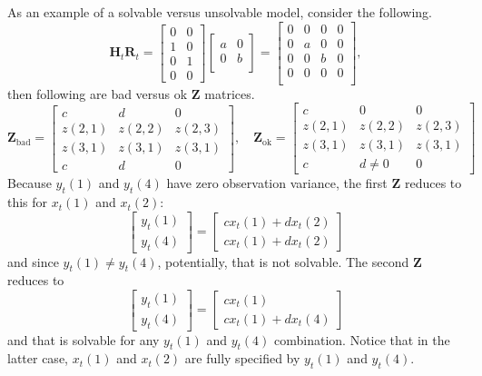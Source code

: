 \documentclass[]{article}
\def\XI{\mbox{\boldmath $\Xi$}}
\def\HH{\mbox{$\mathbf H$}}	\def\hh{\mbox{$\mathbf h$}}
\def\RR{\mbox{$\mathbf R$}}	 \def\rr{\mbox{$\mathbf r$}} \def\Rb{\mbox{$\mathbf H$}}	\def\Rm{\mathbb{R}}
\def\ZZ{\mbox{$\mathbf Z$}}	\def\zz{\mbox{$\mathbf z$}}	\def\Zb{\mbox{$\mathbf M$}} \def\Za{\mbox{$\mathbf N$}} \def\Zm{\XI}
\begin{document}
As an example of a solvable versus unsolvable model, consider the following.
\begin{equation}
\HH_t\RR_t=\begin{bmatrix}
0&0\\
1&0\\
0&1\\
0&0
\end{bmatrix}
\begin{bmatrix}
a&0\\
0&b\\
\end{bmatrix} = \begin{bmatrix}
0&0&0&0\\
0&a&0&0\\
0&0&b&0\\
0&0&0&0\\\end{bmatrix},
\end{equation}
then following are bad versus ok $\ZZ$ matrices.
\begin{equation}
\ZZ_{\text{bad}}=\begin{bmatrix}
c&d&0\\
z(2,1)&z(2,2)&z(2,3)\\
z(3,1)&z(3,1)&z(3,1)\\
c&d&0
\end{bmatrix},\quad
\ZZ_{\text{ok}}=\begin{bmatrix}
c&0&0\\
z(2,1)&z(2,2)&z(2,3)\\
z(3,1)&z(3,1)&z(3,1)\\
c&d\neq0&0
\end{bmatrix}
\end{equation}
Because $y_t(1)$ and $y_t(4)$ have zero observation variance, the first $\ZZ$ reduces to this for $x_t(1)$ and $x_t(2)$:
\begin{equation}
\begin{bmatrix}
y_t(1)\\
y_t(4)
\end{bmatrix}=
\begin{bmatrix}
c x_t(1) + d x_t(2)\\
c x_t(1) + d x_t(2)
\end{bmatrix}
\end{equation}
and since $y_t(1)\neq y_t(4)$, potentially, that is not solvable.  The second $\ZZ$ reduces to
\begin{equation}
\begin{bmatrix}
y_t(1)\\
y_t(4)
\end{bmatrix}=
\begin{bmatrix}
c x_t(1)\\
c x_t(1) + d x_t(4)
\end{bmatrix}
\end{equation}and that is solvable for any $y_t(1)$ and $y_t(4)$ combination.  Notice that in the latter case, $x_t(1)$ and $x_t(2)$ are fully specified by $y_t(1)$ and $y_t(4)$. 
\end{document}

